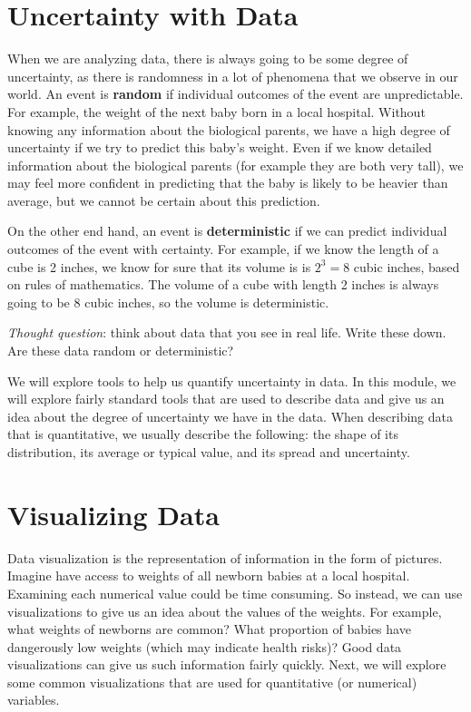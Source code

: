 \documentclass[
]{book}
\begin{document}
\hypertarget{uncertainty-with-data}{%
\section{Uncertainty with Data}\label{uncertainty-with-data}}

When we are analyzing data, there is always going to be some degree of uncertainty, as there is randomness in a lot of phenomena that we observe in our world. An event is \textbf{random} if individual outcomes of the event are unpredictable. For example, the weight of the next baby born in a local hospital. Without knowing any information about the biological parents, we have a high degree of uncertainty if we try to predict this baby's weight. Even if we know detailed information about the biological parents (for example they are both very tall), we may feel more confident in predicting that the baby is likely to be heavier than average, but we cannot be certain about this prediction.

On the other end hand, an event is \textbf{deterministic} if we can predict individual outcomes of the event with certainty. For example, if we know the length of a cube is 2 inches, we know for sure that its volume is is \(2^3 = 8\) cubic inches, based on rules of mathematics. The volume of a cube with length 2 inches is always going to be 8 cubic inches, so the volume is deterministic.

\emph{Thought question}: think about data that you see in real life. Write these down. Are these data random or deterministic?

We will explore tools to help us quantify uncertainty in data. In this module, we will explore fairly standard tools that are used to describe data and give us an idea about the degree of uncertainty we have in the data. When describing data that is quantitative, we usually describe the following: the shape of its distribution, its average or typical value, and its spread and uncertainty.

\hypertarget{visualizing-data}{%
\section{Visualizing Data}\label{visualizing-data}}

Data visualization is the representation of information in the form of pictures. Imagine have access to weights of all newborn babies at a local hospital. Examining each numerical value could be time consuming. So instead, we can use visualizations to give us an idea about the values of the weights. For example, what weights of newborns are common? What proportion of babies have dangerously low weights (which may indicate health risks)? Good data visualizations can give us such information fairly quickly. Next, we will explore some common visualizations that are used for quantitative (or numerical) variables.
\end{document}
